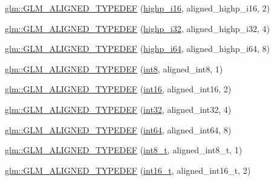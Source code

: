 \begin{DoxyCompactItemize}
\item 
\hyperlink{group__gtx__type__aligned_gae6d384de17588d8edb894fbe06e0d410}{glm\+::\+G\+L\+M\+\_\+\+A\+L\+I\+G\+N\+E\+D\+\_\+\+T\+Y\+P\+E\+D\+EF} (\hyperlink{group__gtc__type__precision_gaa04399853952dbce29cb62e2432f350a}{highp\+\_\+i16}, aligned\+\_\+highp\+\_\+i16, 2)
\item 
\hyperlink{group__gtx__type__aligned_ga9c8172b745ee03fc5b2b91c350c2922f}{glm\+::\+G\+L\+M\+\_\+\+A\+L\+I\+G\+N\+E\+D\+\_\+\+T\+Y\+P\+E\+D\+EF} (\hyperlink{group__gtc__type__precision_ga197d19b585222da57d70238a5cfc2be8}{highp\+\_\+i32}, aligned\+\_\+highp\+\_\+i32, 4)
\item 
\hyperlink{group__gtx__type__aligned_ga77e0dff12aa4020ddc3f8cabbea7b2e6}{glm\+::\+G\+L\+M\+\_\+\+A\+L\+I\+G\+N\+E\+D\+\_\+\+T\+Y\+P\+E\+D\+EF} (\hyperlink{group__gtc__type__precision_gad3cb9a0ac0266ea2c51c6fac256345d1}{highp\+\_\+i64}, aligned\+\_\+highp\+\_\+i64, 8)
\item 
\hyperlink{group__gtx__type__aligned_gabd82b9faa9d4d618dbbe0fc8a1efee63}{glm\+::\+G\+L\+M\+\_\+\+A\+L\+I\+G\+N\+E\+D\+\_\+\+T\+Y\+P\+E\+D\+EF} (\hyperlink{group__gtc__type__precision_ga96254f9c1c4506fc8eb5cf3301ce8565}{int8}, aligned\+\_\+int8, 1)
\item 
\hyperlink{group__gtx__type__aligned_ga285649744560be21000cfd81bbb5d507}{glm\+::\+G\+L\+M\+\_\+\+A\+L\+I\+G\+N\+E\+D\+\_\+\+T\+Y\+P\+E\+D\+EF} (\hyperlink{group__gtc__type__precision_ga2945a61d12771f8954994fcddf02b021}{int16}, aligned\+\_\+int16, 2)
\item 
\hyperlink{group__gtx__type__aligned_ga07732da630b2deda428ce95c0ecaf3ff}{glm\+::\+G\+L\+M\+\_\+\+A\+L\+I\+G\+N\+E\+D\+\_\+\+T\+Y\+P\+E\+D\+EF} (\hyperlink{group__gtc__type__precision_ga632d8b25f6b61659f39ea4321fab92a4}{int32}, aligned\+\_\+int32, 4)
\item 
\hyperlink{group__gtx__type__aligned_ga1a8da2a8c51f69c07a2e7f473aa420f4}{glm\+::\+G\+L\+M\+\_\+\+A\+L\+I\+G\+N\+E\+D\+\_\+\+T\+Y\+P\+E\+D\+EF} (\hyperlink{group__gtc__type__precision_ga435d75819cce297cc5fa21bd84ef89a5}{int64}, aligned\+\_\+int64, 8)
\item 
\hyperlink{group__gtx__type__aligned_ga848aedf13e2d9738acf0bb482c590174}{glm\+::\+G\+L\+M\+\_\+\+A\+L\+I\+G\+N\+E\+D\+\_\+\+T\+Y\+P\+E\+D\+EF} (\hyperlink{group__gtc__type__precision_ga673898d450b2a91186f3c4f40c5f8633}{int8\+\_\+t}, aligned\+\_\+int8\+\_\+t, 1)
\item 
\hyperlink{group__gtx__type__aligned_gafd2803d39049dd45a37a63931e25d943}{glm\+::\+G\+L\+M\+\_\+\+A\+L\+I\+G\+N\+E\+D\+\_\+\+T\+Y\+P\+E\+D\+EF} (\hyperlink{group__gtc__type__precision_gaf89ee61e0d34aa4a462104b7ae7f2da6}{int16\+\_\+t}, aligned\+\_\+int16\+\_\+t, 2)

\end{DoxyCompactItemize}
